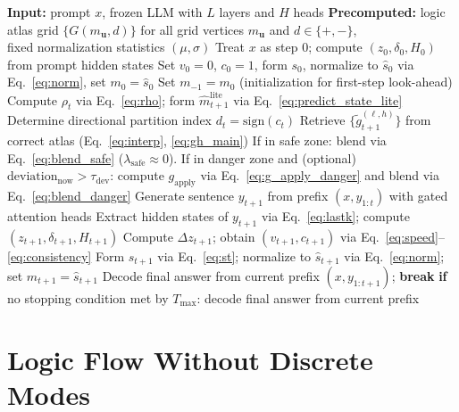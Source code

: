 \documentclass{article}
\begin{document}
\begin{algorithm}[t]
\caption{MoT Inference (Sentence-Level Closed Loop)}
\label{alg:mot}
\begin{algorithmic}[1]
\STATE \textbf{Input:} prompt $x$, frozen LLM with $L$ layers and $H$ heads
\STATE \textbf{Precomputed:} logic atlas grid $\{G(m_{\mathbf{u}}, d)\}$ for all grid vertices $m_{\mathbf{u}}$ and $d\in\{+,-\}$,\\
\hspace{4.2em} fixed normalization statistics $(\mu,\sigma)$
\STATE Treat $x$ as step $0$; compute $(z_0,\delta_0,H_0)$ from prompt hidden states
\STATE Set $v_0=0$, $c_0=1$, form $s_0$, normalize to $\hat s_0$ via Eq.~\eqref{eq:norm}, set $m_0 = \hat s_0$
\STATE Set $m_{-1}=m_0$ (initialization for first-step look-ahead)
    \STATE Compute $\rho_t$ via Eq.~\eqref{eq:rho}; form $\hat m^{\mathrm{lite}}_{t+1}$ via Eq.~\eqref{eq:predict_state_lite}
    \STATE Determine directional partition index $d_t = \mathrm{sign}(c_t)$
    \STATE Retrieve $\{\tilde g^{(\ell,h)}_{t+1}\}$ from correct atlas (Eq.~\eqref{eq:interp}, \eqref{eq:gh_main})
    \STATE If in safe zone: blend via Eq.~\eqref{eq:blend_safe} ($\lambda_{\mathrm{safe}}\approx 0$). If in danger zone and (optional) $\mathrm{deviation}_{\mathrm{now}}>\tau_{\mathrm{dev}}$: compute $g_{\mathrm{apply}}$ via Eq.~\eqref{eq:g_apply_danger} and blend via Eq.~\eqref{eq:blend_danger}
    \STATE Generate sentence $y_{t+1}$ from prefix $(x, y_{1:t})$ with gated attention heads
    \STATE Extract hidden states of $y_{t+1}$ via Eq.~\eqref{eq:lastk}; compute $(z_{t+1},\delta_{t+1},H_{t+1})$
    \STATE Compute $\Delta z_{t+1}$; obtain $(v_{t+1},c_{t+1})$ via Eq.~\eqref{eq:speed}--\eqref{eq:consistency}
    \STATE Form $s_{t+1}$ via Eq.~\eqref{eq:st}; normalize to $\hat s_{t+1}$ via Eq.~\eqref{eq:norm}; set $m_{t+1}=\hat s_{t+1}$
        \STATE Decode final answer from current prefix $(x, y_{1:t+1})$; \textbf{break}
    \ENDIF
\ENDFOR
\STATE \textbf{if} no stopping condition met by $T_{\max}$: decode final answer from current prefix
\end{algorithmic}
\end{algorithm}

\section{Logic Flow Without Discrete Modes}
\label{sec:humanlike}
\end{document}

